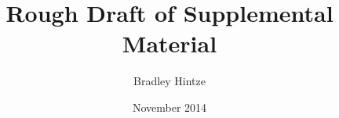 \documentclass{article}
\begin{document}
\title{Rough Draft of Supplemental Material}
\author{Bradley Hintze}
\date{November 2014}
\maketitle
\tableofcontents

\newpage

\newpage

\newpage

\newpage
%
\end{document}
